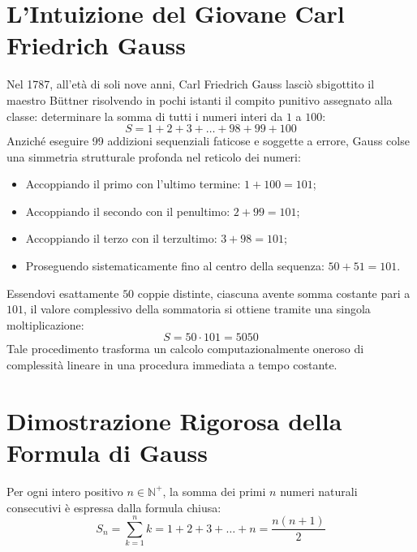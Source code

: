 \documentclass[11pt,a4paper,oneside]{report}
\begin{document}
\section{L'Intuizione del Giovane Carl Friedrich Gauss}
\begin{aneddoto}
Nel 1787, all'et\`a di soli nove anni, Carl Friedrich Gauss lasci\`o sbigottito il maestro B\"uttner risolvendo in pochi istanti il compito punitivo assegnato alla classe: determinare la somma di tutti i numeri interi da $1$ a $100$:
\[
S = 1 + 2 + 3 + \dots + 98 + 99 + 100
\]
Anzich\'e eseguire 99 addizioni sequenziali faticose e soggette a errore, Gauss colse una simmetria strutturale profonda nel reticolo dei numeri:
\begin{itemize}[leftmargin=2em]
  \item Accoppiando il primo con l'ultimo termine: $1 + 100 = 101$;
  \item Accoppiando il secondo con il penultimo: $2 + 99 = 101$;
  \item Accoppiando il terzo con il terzultimo: $3 + 98 = 101$;
  \item Proseguendo sistematicamente fino al centro della sequenza: $50 + 51 = 101$.
\end{itemize}
Essendovi esattamente $50$ coppie distinte, ciascuna avente somma costante pari a $101$, il valore complessivo della sommatoria si ottiene tramite una singola moltiplicazione:
\[
S = 50 \cdot 101 = 5050
\]
Tale procedimento trasforma un calcolo computazionalmente oneroso di complessit\`a lineare in una procedura immediata a tempo costante.
\end{aneddoto}

\section{Dimostrazione Rigorosa della Formula di Gauss}
\begin{definizione}
Per ogni intero positivo $n \in \mathbb{N}^+$, la somma dei primi $n$ numeri naturali consecutivi \`e espressa dalla formula chiusa:
\[
S_n = \sum_{k=1}^n k = 1 + 2 + 3 + \dots + n = \frac{n(n + 1)}{2}
\]
\end{definizione}
\end{document}
